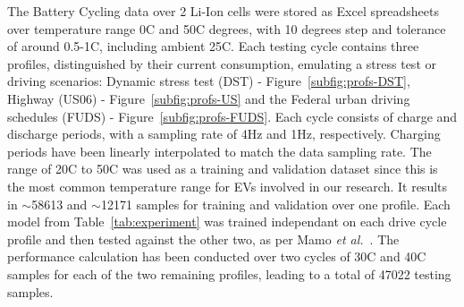 %
The Battery Cycling data over 2 Li-Ion cells were stored as Excel spreadsheets over temperature range 0\textdegree{}C and 50\textdegree{}C degrees, with 10 degrees step and tolerance of around 0.5-1\textdegree{}C, including ambient 25\textdegree{}C.
Each testing cycle contains three profiles, distinguished by their current consumption, emulating a stress test or driving scenarios: Dynamic stress test (DST) - Figure~\ref{subfig:profs-DST}, Highway (US06) - Figure~\ref{subfig:profs-US} and the Federal urban driving schedules (FUDS) - Figure~\ref{subfig:profs-FUDS}.
Each cycle consists of charge and discharge periods, with a sampling rate of 4Hz and 1Hz, respectively.
Charging periods have been linearly interpolated to match the data sampling rate.
The range of 20\textdegree{}C to 50\textdegree{}C was used as a training and validation dataset since this is the most common temperature range for EVs involved in our research.
It results in $\sim$58613 and $\sim$12171 samples for training and validation over one profile.
Each model from \mbox{Table~\ref{tab:experiment}} was trained independant on each drive cycle profile and then tested against the other two, as per Mamo \textit{et al.}~\cite{mamo_long_2020}.
The performance calculation has been conducted over two cycles of 30\textdegree{}C and 40\textdegree{}C samples for each of the two remaining profiles, leading to a total of 47022 testing samples.

